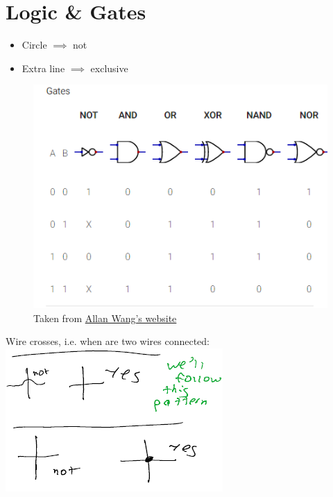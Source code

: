 \documentclass[12 pt]{article}
\begin{document}
	\section{Logic \& Gates}
	\begin{itemize}
		\item 
		Circle $\implies$ not
		\item Extra line $\implies$ exclusive
	\end{itemize}
	\begin{figure}[H]
		\caption{Taken from \href{https://www.allanwang.ca/notes/mcgill/comp273/0.php}{Allan Wang's website}}
		\begin{center}
			\includegraphics{gatess}
		\end{center}
\end{figure}
		Wire crosses, i.e. when are two wires connected: \includegraphics{wc}
\end{document}
